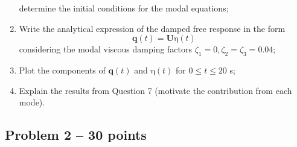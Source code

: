 \documentclass[11pt,a4paper]{article}
\begin{document}
\begin{enumerate}
\begin{equation}
	\end{equation}
	determine the initial conditions for the modal equations;
	\item Write the analytical expression of the damped free response in the form
	\begin{equation} \label{e3}
		\mathbf{q}(t) = \mathbf{U} \bm{\mathrm{\eta}}(t)
	\end{equation}
	considering the modal viscous damping factors $\zeta_1 = 0, \zeta_2=\zeta_3 = 0.04$;
	\item Plot the components of $\mathbf{q}(t)$ and $\bm{\mathrm{\eta}}(t)$ for $0 \le t \le 20$ s;
	\item Explain the results from Question 7 (motivate the contribution from each mode).  
\end{enumerate}

\clearpage 

\subsection*{Problem 2 -- 30 points}
\end{document}
